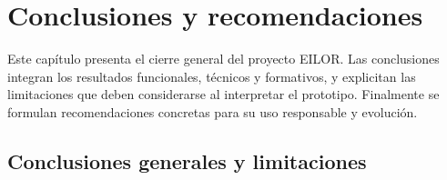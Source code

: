 \chapter{Conclusiones y recomendaciones}
\label{cap:conclusiones}

Este capítulo presenta el cierre general del proyecto EILOR. Las conclusiones
integran los resultados funcionales, técnicos y formativos, y explicitan las
limitaciones que deben considerarse al interpretar el prototipo. Finalmente se
formulan recomendaciones concretas para su uso responsable y evolución.

\section{Conclusiones generales y limitaciones}

